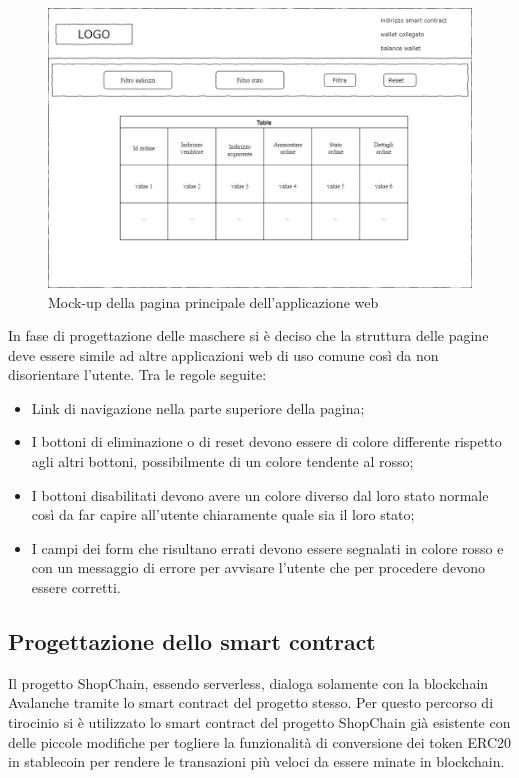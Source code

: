 \begin{figure}[!h] 
    \centering 
    \includegraphics[width=0.8\columnwidth]{immagini/progettazione/homePage.jpg} 
    \caption{Mock-up della pagina principale dell'applicazione web}
\end{figure}

In fase di progettazione delle maschere si è deciso che la struttura delle pagine deve essere simile ad altre applicazioni web di uso comune così da non disorientare l’utente. Tra le regole seguite:
\begin{itemize}
    \item Link di navigazione nella parte superiore della pagina;
    \item I bottoni di eliminazione o di reset devono essere di colore differente rispetto agli altri bottoni, possibilmente di un colore tendente al rosso;
    \item I bottoni disabilitati devono avere un colore diverso dal loro stato normale così da far capire all’utente chiaramente quale sia il loro stato;
    \item I campi dei form che risultano errati devono essere segnalati in colore rosso e con un messaggio di errore per avvisare l’utente che per procedere devono essere corretti.
\end{itemize}


\subsection{Progettazione dello smart contract}

Il progetto ShopChain, essendo serverless, dialoga solamente con la blockchain Avalanche tramite lo smart contract del progetto stesso. Per questo percorso di tirocinio si è utilizzato lo smart contract del progetto ShopChain già esistente con delle piccole modifiche per togliere la funzionalità di conversione dei token ERC20 in stablecoin per rendere le transazioni più veloci da essere minate in blockchain.

